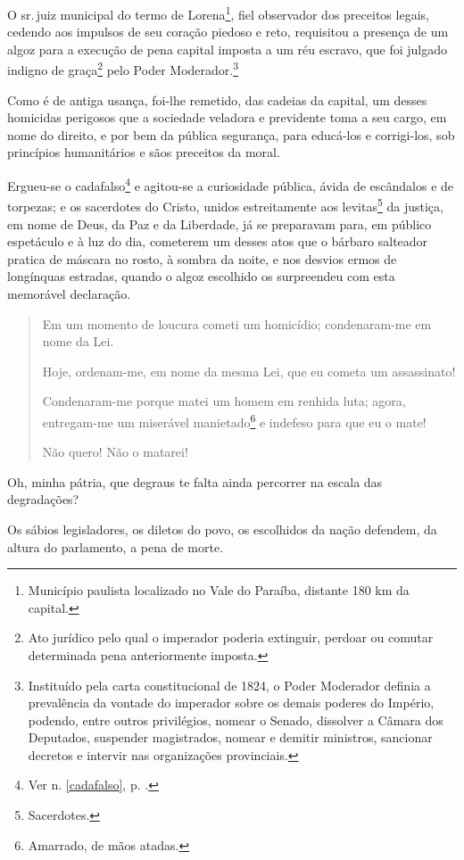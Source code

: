 O sr.\,juiz municipal do termo de Lorena\footnote{Município paulista
  localizado no Vale do Paraíba, distante 180 km da capital.}, fiel
observador dos preceitos legais, cedendo aos impulsos de seu coração
piedoso e reto, requisitou a presença de um algoz para a execução de
pena capital imposta a um réu escravo, que foi julgado indigno de
graça\footnote{Ato jurídico pelo qual o imperador poderia extinguir,
  perdoar ou comutar determinada pena anteriormente imposta.} pelo Poder
Moderador.\footnote{Instituído pela carta constitucional de 1824, o
  Poder Moderador definia a prevalência da vontade do imperador sobre os
  demais poderes do Império, podendo, entre outros privilégios, nomear o
  Senado, dissolver a Câmara dos Deputados, suspender magistrados,
  nomear e demitir ministros, sancionar decretos e intervir nas
  organizações provinciais.\label{moderador}}

Como é de antiga usança, foi-lhe remetido, das cadeias da capital, um
desses homicidas perigosos que a sociedade veladora e previdente toma a
seu cargo, em nome do direito, e por bem da pública segurança, para
educá-los e corrigi-los, sob princípios humanitários e sãos preceitos da
moral.

Ergueu-se o cadafalso\footnote{Ver n. \ref{cadafalso}, p. \pageref{cadafalso}.} 
e agitou-se a curiosidade pública, ávida de escândalos e de
torpezas; e os sacerdotes do Cristo, unidos estreitamente aos
levitas\footnote{Sacerdotes.} da justiça, em nome de Deus, da Paz e da
Liberdade, já se preparavam para, em público espetáculo e à luz do dia,
cometerem um desses atos que o bárbaro salteador pratica de máscara no
rosto, à sombra da noite, e nos desvios ermos de longínquas estradas,
quando o algoz escolhido os surpreendeu com esta memorável declaração.


\begin{quote}
Em um momento de loucura cometi um homicídio; condenaram-me em nome da
Lei.

Hoje, ordenam-me, em nome da mesma Lei, que eu cometa um assassinato!

Condenaram-me porque matei um homem em renhida luta; agora, entregam-me
um miserável manietado\footnote{Amarrado, de mãos atadas.} e indefeso
para que eu o mate!

Não quero! Não o matarei!
\end{quote}

Oh, minha pátria, que degraus te falta ainda percorrer na escala das
degradações?

Os sábios legisladores, os diletos do povo, os escolhidos da nação
defendem, da altura do parlamento, a pena de morte.

